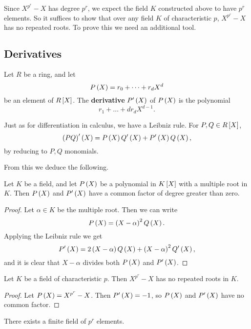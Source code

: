 Since $ X^{p^r} - X $ has degree $ p^r $, we expect the field $ K $ constructed above to have $ p^r $ elements. So it suffices to show that over any field $ K $ of characteristic $ p $, $ X^{p^r} - X $ has no repeated roots. To prove this we need an additional tool.

\subsection{Derivatives}

\begin{definition}
Let $ R $ be a ring, and let
$$ P\rb{X} = r_0 + \dots + r_dX^d $$
be an element of $ R\sb{X} $. The \textbf{derivative} $ P'\rb{X} $ of $ P\rb{X} $ is the polynomial
$$ r_1 + \dots + dr_dX^{d - 1}. $$
\end{definition}

\begin{note*}
Just as for differentiation in calculus, we have a Leibniz rule. For $ P, Q \in R\sb{X} $,
$$ \rb{PQ}'\rb{X} = P\rb{X}Q'\rb{X} + P'\rb{X}Q\rb{X}, $$
by reducing to $ P, Q $ monomials.
\end{note*}

From this we deduce the following.

\begin{lemma}
Let $ K $ be a field, and let $ P\rb{X} $ be a polynomial in $ K\sb{X} $ with a multiple root in $ K $. Then $ P\rb{X} $ and $ P'\rb{X} $ have a common factor of degree greater than zero.
\end{lemma}

\begin{proof}
Let $ \alpha \in K $ be the multiple root. Then we can write
$$ P\rb{X} = \rb{X - \alpha}^2Q\rb{X}. $$
Applying the Leibniz rule we get
$$ P'\rb{X} = 2\rb{X - \alpha}Q\rb{X} + \rb{X - \alpha}^2Q'\rb{X}, $$
and it is clear that $ X - \alpha $ divides both $ P\rb{X} $ and $ P'\rb{X} $.
\end{proof}

\begin{corollary}
Let $ K $ be a field of characteristic $ p $. Then $ X^{p^r} - X $ has no repeated roots in $ K $.
\end{corollary}

\begin{proof}
Let $ P\rb{X} = X^{p^r} - X $. Then $ P'\rb{X} = -1 $, so $ P\rb{X} $ and $ P'\rb{X} $ have no common factor.
\end{proof}

\begin{corollary}
There exists a finite field of $ p^r $ elements.
\end{corollary}

